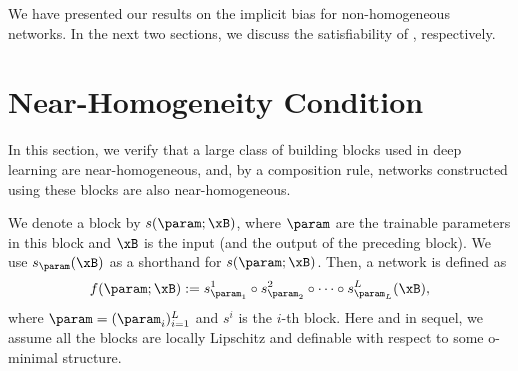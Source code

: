 


We have presented our results on the implicit bias for non-homogeneous networks. In the next two sections, we discuss the satisfiability of , respectively.





\section{Near-Homogeneity Condition} \label{sec:near-homo-nn}

In this section, we verify that a large class of building blocks used in deep learning are near-homogeneous, and, by a composition rule, networks constructed using these blocks are also near-homogeneous. 

We denote a block by $s(\param;\xB)$, where $\param$ are the trainable parameters in this block and $\xB$ is the input (and the output of the preceding block). 
We use $s_{\param}(\xB)$ as a shorthand for $s(\param;\xB)$. 
Then, a network is defined as
\begin{equation}\label{eq:network}
    f(\param;\xB) := s^1_{\param_1} \circ s^2_{\param_2} \circ \cdots \circ s^L_{\param_L}(\xB),
\end{equation}
where $\param = (\param_i)_{i=1}^L$ and $s^i$ is the $i$-th block. Here and in sequel, we assume all the blocks are locally Lipschitz and definable with respect to some o-minimal structure.

